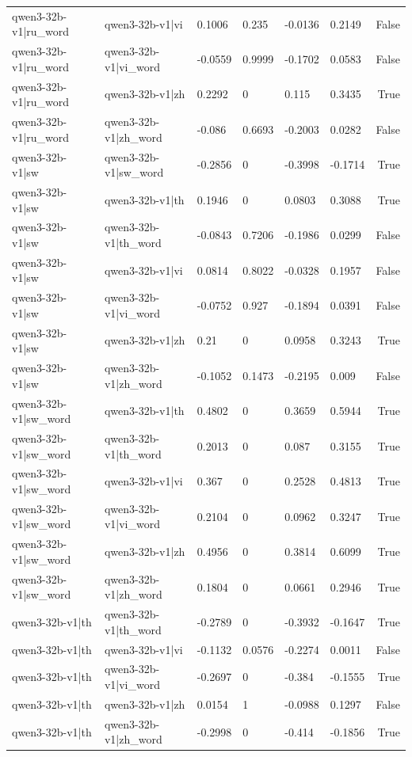 \begin{table}
\begin{tabular}{llllllr}
qwen3-32b-v1|ru_word & qwen3-32b-v1|vi & 0.1006 & 0.235 & -0.0136 & 0.2149 & False \\
qwen3-32b-v1|ru_word & qwen3-32b-v1|vi_word & -0.0559 & 0.9999 & -0.1702 & 0.0583 & False \\
qwen3-32b-v1|ru_word & qwen3-32b-v1|zh & 0.2292 & 0 & 0.115 & 0.3435 & True \\
qwen3-32b-v1|ru_word & qwen3-32b-v1|zh_word & -0.086 & 0.6693 & -0.2003 & 0.0282 & False \\
qwen3-32b-v1|sw & qwen3-32b-v1|sw_word & -0.2856 & 0 & -0.3998 & -0.1714 & True \\
qwen3-32b-v1|sw & qwen3-32b-v1|th & 0.1946 & 0 & 0.0803 & 0.3088 & True \\
qwen3-32b-v1|sw & qwen3-32b-v1|th_word & -0.0843 & 0.7206 & -0.1986 & 0.0299 & False \\
qwen3-32b-v1|sw & qwen3-32b-v1|vi & 0.0814 & 0.8022 & -0.0328 & 0.1957 & False \\
qwen3-32b-v1|sw & qwen3-32b-v1|vi_word & -0.0752 & 0.927 & -0.1894 & 0.0391 & False \\
qwen3-32b-v1|sw & qwen3-32b-v1|zh & 0.21 & 0 & 0.0958 & 0.3243 & True \\
qwen3-32b-v1|sw & qwen3-32b-v1|zh_word & -0.1052 & 0.1473 & -0.2195 & 0.009 & False \\
qwen3-32b-v1|sw_word & qwen3-32b-v1|th & 0.4802 & 0 & 0.3659 & 0.5944 & True \\
qwen3-32b-v1|sw_word & qwen3-32b-v1|th_word & 0.2013 & 0 & 0.087 & 0.3155 & True \\
qwen3-32b-v1|sw_word & qwen3-32b-v1|vi & 0.367 & 0 & 0.2528 & 0.4813 & True \\
qwen3-32b-v1|sw_word & qwen3-32b-v1|vi_word & 0.2104 & 0 & 0.0962 & 0.3247 & True \\
qwen3-32b-v1|sw_word & qwen3-32b-v1|zh & 0.4956 & 0 & 0.3814 & 0.6099 & True \\
qwen3-32b-v1|sw_word & qwen3-32b-v1|zh_word & 0.1804 & 0 & 0.0661 & 0.2946 & True \\
qwen3-32b-v1|th & qwen3-32b-v1|th_word & -0.2789 & 0 & -0.3932 & -0.1647 & True \\
qwen3-32b-v1|th & qwen3-32b-v1|vi & -0.1132 & 0.0576 & -0.2274 & 0.0011 & False \\
qwen3-32b-v1|th & qwen3-32b-v1|vi_word & -0.2697 & 0 & -0.384 & -0.1555 & True \\
qwen3-32b-v1|th & qwen3-32b-v1|zh & 0.0154 & 1 & -0.0988 & 0.1297 & False \\
qwen3-32b-v1|th & qwen3-32b-v1|zh_word & -0.2998 & 0 & -0.414 & -0.1856 & True \\

\end{tabular}
\end{table}
